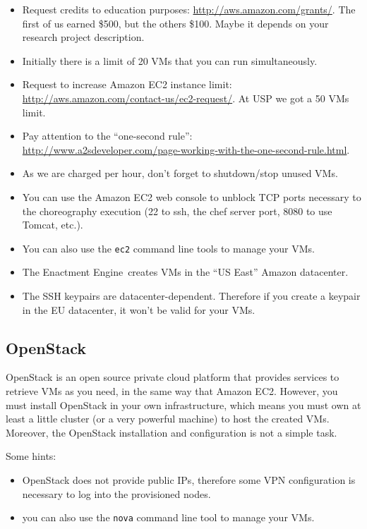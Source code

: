 \documentclass[a4paper, 10pt]{article}
\newcommand{\ee}{Enactment Engine}
\begin{document}
\begin{itemize}
\item Request credits to education purposes: \url{http://aws.amazon.com/grants/}. The first of us earned \$500, but the others \$100. Maybe it depends on your research project description.
\item Initially there is a limit of 20 VMs that you can run simultaneously.
\item Request to increase Amazon EC2 instance limit: \url{http://aws.amazon.com/contact-us/ec2-request/}. At USP we got a 50 VMs limit.
\item Pay attention to the ``one-second rule'': \\ \url{http://www.a2sdeveloper.com/page-working-with-the-one-second-rule.html}.
\item As we are charged per hour, don't forget to shutdown/stop unused VMs.
\item You can use the Amazon EC2 web console to unblock TCP ports necessary to the choreography execution (22 to ssh, the chef server port, 8080 to use Tomcat, etc.).
\item You can also use the \texttt{ec2} command line tools to manage your VMs.
\item The \ee\ creates VMs in the ``US East'' Amazon datacenter.
\item The SSH keypairs are datacenter-dependent. Therefore if you create a keypair in the EU
datacenter, it won't be valid for your VMs.
\end{itemize}

\subsection{OpenStack}

OpenStack is an open source private cloud platform that provides services to retrieve VMs as you need, in the same way that Amazon EC2. However, you must install OpenStack in your own infrastructure, which means you must own at least a little cluster (or a very powerful machine) to host the created VMs. Moreover, the OpenStack installation and configuration is not a simple task.

Some hints:

\begin{itemize}
\item OpenStack does not provide public IPs, therefore some VPN configuration is necessary to log into the provisioned nodes.
\item you can also use the \texttt{nova} command line tool to manage your VMs.
\end{itemize}
\end{document}
